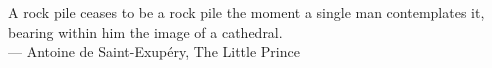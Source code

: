 
\cleardoublepage
{}
\thispagestyle{empty}

\vspace*{3cm}

\begin{center}
A rock pile ceases to be a rock pile the moment a single man contemplates it, bearing within him the image of a cathedral. \\ \medskip
--- Antoine de Saint-Exupéry, The Little Prince
\end{center}

